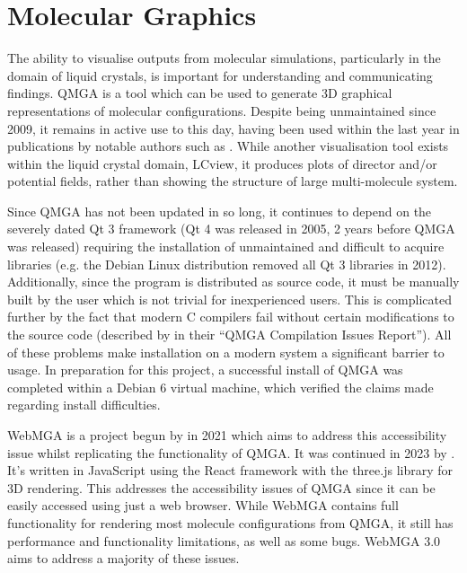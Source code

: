\section{Molecular Graphics}
The ability to visualise outputs from molecular simulations, particularly in the domain of liquid crystals, is important for understanding and communicating findings. QMGA\cite{gabriel2008molecular} is a tool which can be used to generate 3D graphical representations of molecular configurations. Despite being unmaintained since 2009\cite{qmga_release}, it remains in active use to this day, having been used within the last year in publications by notable authors such as \textcite{ramirez2023densest,mazzilli2023phase}. While another visualisation tool exists within the liquid crystal domain, LCview\cite{james2006finite,LCview}, it produces plots of director and/or potential fields, rather than showing the structure of large multi-molecule system.

Since QMGA has not been updated in so long, it continues to depend on the severely dated Qt 3 framework (Qt 4 was released in 2005, 2 years before QMGA was released) requiring the installation of unmaintained and difficult to acquire libraries (e.g. the Debian Linux distribution removed all Qt 3 libraries in 2012\cite{qt3_removed}). Additionally, since the program is distributed as source code, it must be manually built by the user which is not trivial for inexperienced users. This is complicated further by the fact that modern C compilers fail without certain modifications to the source code (described by \textcite{Battistini_2021} in their ``QMGA Compilation Issues Report''). All of these problems make installation on a modern system a significant barrier to usage. In preparation for this project, a successful install of QMGA was completed within a Debian 6 virtual machine, which verified the claims made regarding install difficulties.

WebMGA is a project begun by \textcite{Battistini_2021} in 2021 which aims to address this accessibility issue whilst replicating the functionality of QMGA. It was continued in 2023 by \textcite{webmga_2}. It's written in JavaScript using the React\cite{react} framework with the three.js\cite{three} library for 3D rendering. This addresses the accessibility issues of QMGA since it can be easily accessed using just a web browser. While WebMGA contains full functionality for rendering most molecule configurations from QMGA, it still has performance and functionality limitations, as well as some bugs. WebMGA 3.0 aims to address a majority of these issues.

